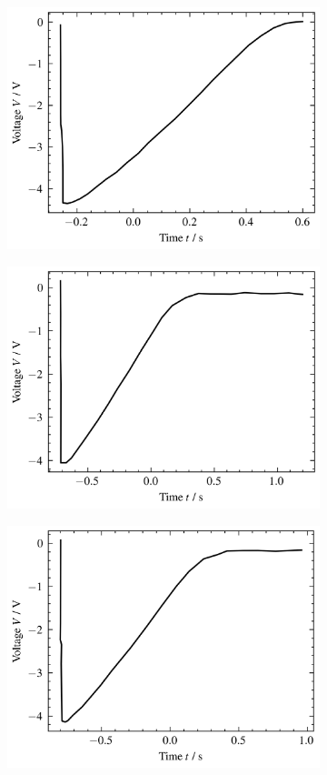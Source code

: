 \begin{figure}
	\addtocounter{figure}{-1}
	\centering
	\begin{subfigure}{0.48\columnwidth}
		\setcounter{subfigure}{4}
		\centering
		\includegraphics[width=0.8\linewidth]{src/figures/oscilloscope-each/p80-d0-oscilloscope.csv.png}
		\label{fig:oscilloscope-each-p80-d0}
	\end{subfigure}
	\begin{subfigure}{0.48\columnwidth}
		\centering
		\includegraphics[width=0.8\linewidth]{src/figures/oscilloscope-each/p80-d60-oscilloscope.csv.png}
		\label{fig:oscilloscope-each-p80-d60}
	\end{subfigure}
	\begin{subfigure}{0.48\columnwidth}
		\centering
		\includegraphics[width=0.8\linewidth]{src/figures/oscilloscope-each/p80-d80-oscilloscope.csv.png}

\end{subfigure}
\end{figure}
